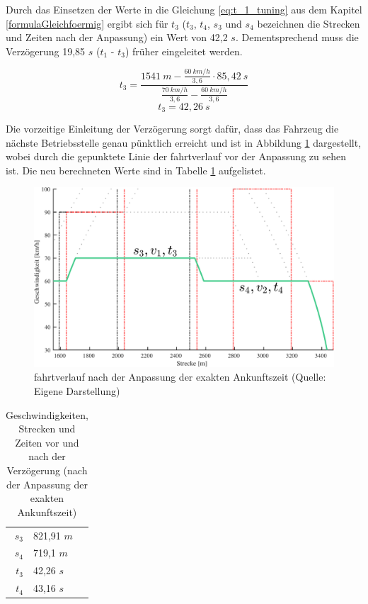Durch das Einsetzen der Werte in die Gleichung \ref{eq:t_1_tuning} aus dem Kapitel \ref{formulaGleichfoermig} ergibt sich für $t_3$ ($t_3$, $t_4$, $s_3$ und $s_4$ bezeichnen die Strecken und Zeiten nach der Anpassung) ein Wert von 42,2 $s$. Dementsprechend muss die Verzögerung 19,85 $s$ ($t_1$ - $t_3$) früher eingeleitet werden.
\begin{figure}
\[t_{3} = \frac{1541\:m - \frac{60\:km/h}{3,6} \cdot 85,42\:s}{\frac{70\:km/h}{3,6} - \frac{60\:km/h}{3,6}}\]
\[t_{3} = 42,26\:s\]
\end{figure}
Die vorzeitige Einleitung der Verzögerung sorgt dafür, dass das Fahrzeug die nächste Betriebsstelle genau pünktlich erreicht und ist in Abbildung \ref{fig:it12} dargestellt, wobei durch die gepunktete Linie der \Gls{fahrtverlauf} vor der Anpassung zu sehen ist. Die neu berechneten Werte sind in Tabelle \ref{table:speed_fine_tuning_ex_2} aufgelistet.
\begin{figure}
  \includegraphics[width=\linewidth]{../images/matlab/it12.pdf}
  \caption[\Gls{fahrtverlauf} nach der Anpassung der exakten Ankunftszeit]{\Gls{fahrtverlauf} nach der Anpassung der exakten Ankunftszeit (Quelle: Eigene Darstellung)}
  \label{fig:it12}
\end{figure}
\begin{table}
\begin{center}
\renewcommand{\arraystretch}{1.2}
\begin{tabular}{r l}
$s_3$                   	&   821,91 $m$                      	\\ 
$s_4$                   	&   719,1 $m$                         	\\ 
$t_3$                   	&   42,26 $s$                         	\\ 
$t_4$                   	&   43,16 $s$                         	\\ 
\end{tabular}
\renewcommand{\arraystretch}{1}
\caption{Geschwindigkeiten, Strecken und Zeiten vor und nach der Verzögerung (nach der Anpassung der exakten Ankunftszeit)}
\label{table:speed_fine_tuning_ex_2}
\end{center}
\end{table}
